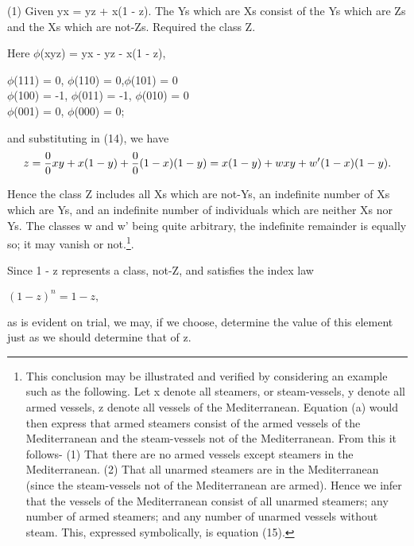 \documentclass{article}
\begin{document}
{{{{\hspace{.2in}
(1) Given yx = yz + x(1 - z).
The Ys which are Xs consist of the Ys which are Zs and the Xs which are not-Zs.
Required the class Z.\vspace{.05in}

\hspace{.2in}
Here $\phi$(xyz) = yx - yz - x(1 - z),
\begin{center}$\phi$(111) = 0, $\phi$(110) = 0,$\phi$(101) = 0\vspace{.05in}\\
$\phi$(100) = -1, $\phi$(011) = -1,  $\phi$(010) = 0 \vspace{.05in}\\
$\phi$(001) = 0, $\phi$(000) = 0;\end{center}
and substituting in (14), we have 
\begin{equation}z=\frac{0}{0}xy+x(1-y)+\frac{0}{0}(1-x)(1-y)\\
			=x(1-y)+wxy+w'(1-x)(1-y).\end{equation}

Hence the class Z includes all Xs which are not-Ys, an indefinite number of
Xs which are Ys, and an indefinite number of individuals which are neither Xs
nor Ys. The classes w and w' being quite arbitrary, the indefinite remainder is
equally so; it may vanish or not.\footnote[3]{\footnotesize{This conclusion may be illustrated and verified by considering an example such as the
following.
Let x denote all steamers, or steam-vessels,
y denote all armed vessels,
z denote all vessels of the Mediterranean.
Equation (a) would then express that armed steamers consist of the armed vessels of the
Mediterranean and the steam-vessels not of the Mediterranean. From this it follows-
(1) That there are no armed vessels except steamers in the Mediterranean.
(2) That all unarmed steamers are in the Mediterranean (since the steam-vessels not of the
Mediterranean are armed). Hence we infer that the vessels of the Mediterranean consist of
all unarmed steamers; any number of armed steamers; and any number of unarmed vessels
without steam. This, expressed symbolically, is equation (15).}}.\vspace{.05in}

\hspace{.2in}
Since 1 - z represents a class, not-Z, and satisfies the index law\\
\begin{center}$(1-z)^n=1-z,$\end{center}
as is evident on trial, we may, if we choose, determine the value of this element
just as we should determine that of z.\vspace{.05in}

}}}}
\end{document}

